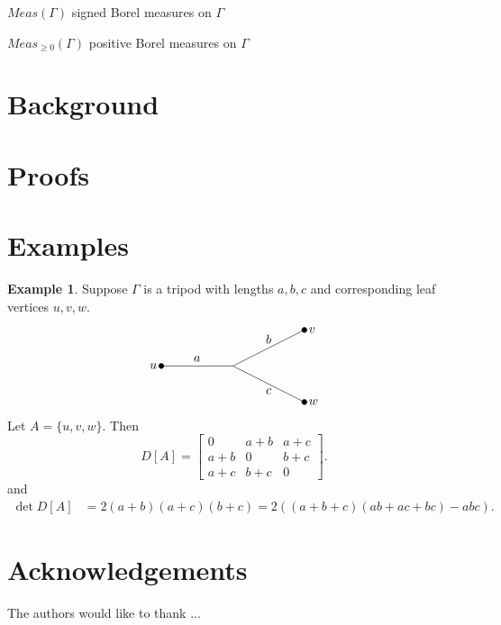 \documentclass{amsart}
\theoremstyle{definition}
\newtheorem{eg}[thm]{Example}
\begin{document}
$Meas(\Gamma)$ signed Borel measures on $\Gamma$

$Meas_{\geq 0}(\Gamma)$ positive Borel measures on $\Gamma$

\section{Background}


\section{Proofs}



\section{Examples}
\begin{eg}
Suppose $\Gamma$ is a tripod with lengths $a,b,c$ and corresponding leaf vertices $u,v,w$.
\[
\begin{tikzpicture}
	\draw (0,0) -- (-2,0);
	\draw (2,1) -- (0,0) -- (2,-1);
	\filldraw[black] (-2,0) circle (2pt);
	\filldraw[black] (2,1) circle (2pt);
	\filldraw[black] (2,-1) circle (2pt);

	\node[above] at (-1,0) {$a$};
	\node[above] at (1,0.5) {$b$};
	\node[below] at (1,-0.5) {$c$};

	\node[left] at (-2,0) {$u$};
	\node[right] at (2,1) {$v$};
	\node[right] at (2,-1) {$w$};
\end{tikzpicture}
\]
Let $A = \{u,v,w\}$.
Then 
$$
D[A] = \begin{bmatrix}
0 & a + b & a + c \\
a + b & 0 & b + c \\
a + c & b + c & 0
\end{bmatrix}.
$$
and
\begin{align*}
\det D[A] &= 2(a+b)(a+c)(b+c) 
= 2\left( (a+b+c)(ab + ac + bc) - abc \right).
\end{align*}
\end{eg}


\section*{Acknowledgements}
The authors would like to thank ...


 

\end{document}
